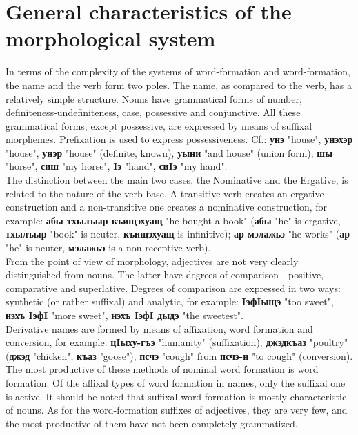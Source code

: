 \documentclass[a4paper,12pt]{book}
\newcommand{\1}[1]{\textbf{\emph{#1}}} %
\newcommand{\2}[1]{\textbf{[#1]}} %
\newcommand{\3}[1]{\fontsize{11pt}{0cm}\textbf{\emph{#1}}} %
\newcommand{\4}[1]{\fontsize{10pt}{0cm}\emph{#1}}	%
\newcommand{\5}[1]{\textbf{/#1/}} %
\newcommand{\6}[1]{\textbf{[#1]}} %
\newcommand{\7}[1]{\fontsize{12pt}{0cm}\emph{#1}} %
\newcommand{\8}[1]{\fontsize{12pt}{0cm}`#1'} %
\newcommand{\9}[1]{\fontsize{12pt}{0cm}(lit. `#1')} %
\begin{document}
\section{General characteristics of the morphological system}
In terms of the complexity of the systems of word-formation and word-formation, the name and the verb form two poles. The name, as compared to the verb, has a relatively simple structure. Nouns have grammatical forms of number, definiteness-undefiniteness, case, possessive and conjunctive. All these grammatical forms, except possessive, are expressed by means of suffixal morphemes. Prefixation is used to express possessiveness. Cf.: \textbf{унэ} "house", \textbf{унэхэр} "house", \textbf{унэр} "house" (definite, known), \textbf{уыни} "and house" (union form); \textbf{шы} "horse", \textbf{сиш} "my horse", \textbf{Iэ} "hand", \textbf{сиIэ} "my hand".\\
The distinction between the main two cases, the Nominative and the Ergative, is related to the nature of the verb base. A transitive verb creates an ergative construction and a non-transitive one creates a nominative construction, for example: \textbf{абы тхылъыр къищэхуащ} "he bought a book" (\textbf{абы} "he" is ergative, \textbf{тхылъыр} "book" is neuter, \textbf{къищэхуащ} is infinitive); \textbf{ар мэлажьэ} "he works" (\textbf{ар} "he" is neuter, \textbf{мэлажьэ} is a non-receptive verb).\\
From the point of view of morphology, adjectives are not very clearly distinguished from nouns. The latter have degrees of comparison - positive, comparative and superlative. Degrees of comparison are expressed in two ways: synthetic (or rather suffixal) and analytic, for example: \textbf{IэфIыщэ} "too sweet", \textbf{нэхъ IэфI} "more sweet", \textbf{нэхъ IэфI дыдэ} "the sweetest".\\
Derivative names are formed by means of affixation, word formation and conversion, for example: \textbf{цIыху-гъэ} "humanity" (suffixation); \textbf{джэдкъаз} "poultry" (\textbf{джэд} "chicken", \textbf{къаз} "goose"), \textbf{псчэ} "cough" from \textbf{псчэ-н} "to cough" (conversion). The most productive of these methods of nominal word formation is word formation. Of the affixal types of word formation in names, only the suffixal one is active. It should be noted that suffixal word formation is mostly characteristic of nouns. As for the word-formation suffixes of adjectives, they are very few, and the most productive of them have not been completely grammatized.\\
\end{document}
